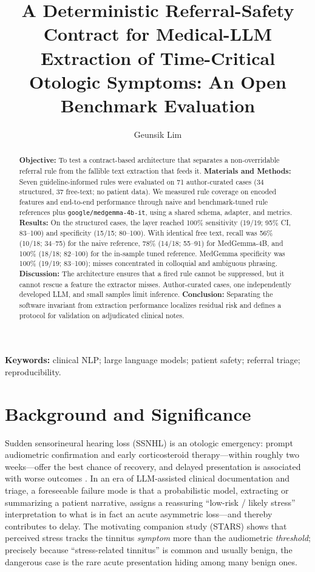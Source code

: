 \documentclass[11pt]{article}
\title{A Deterministic Referral-Safety Contract for Medical-LLM Extraction of Time-Critical Otologic Symptoms: An Open Benchmark Evaluation}
\author[1]{Geunsik Lim}
\affil[1]{Sungkyunkwan University, Republic of Korea; \texttt{leemgs@g.skku.edu}; ORCID \href{https://orcid.org/0000-0003-1845-7132}{0000-0003-1845-7132}}
\date{}
\begin{document}
\maketitle
\thispagestyle{fancy}

\begin{abstract}
\noindent\textbf{Objective:} To test a contract-based architecture that separates a non-overridable referral rule from the fallible text extraction that feeds it. \textbf{Materials and Methods:} Seven guideline-informed rules were evaluated on 71 author-curated cases (34 structured, 37 free-text; no patient data). We measured rule coverage on encoded features and end-to-end performance through naive and benchmark-tuned rule references plus \texttt{google/medgemma-4b-it}, using a shared schema, adapter, and metrics. \textbf{Results:} On the structured cases, the layer reached 100\% sensitivity (19/19; 95\% CI, 83--100) and specificity (15/15; 80--100). With identical free text, recall was 56\% (10/18; 34--75) for the naive reference, 78\% (14/18; 55--91) for MedGemma-4B, and 100\% (18/18; 82--100) for the in-sample tuned reference. MedGemma specificity was 100\% (19/19; 83--100); misses concentrated in colloquial and ambiguous phrasing. \textbf{Discussion:} The architecture ensures that a fired rule cannot be suppressed, but it cannot rescue a feature the extractor misses. Author-curated cases, one independently developed LLM, and small samples limit inference. \textbf{Conclusion:} Separating the software invariant from extraction performance localizes residual risk and defines a protocol for validation on adjudicated clinical notes.
\end{abstract}

\noindent\textbf{Keywords:} clinical NLP; large language models; patient safety; referral triage; reproducibility.

\section{Background and Significance}
Sudden sensorineural hearing loss (SSNHL) is an otologic emergency: prompt audiometric confirmation and early corticosteroid therapy---within roughly two weeks---offer the best chance of recovery, and delayed presentation is associated with worse outcomes \cite{chandrasekhar2019ssnhl}. In an era of LLM-assisted clinical documentation and triage, a foreseeable failure mode is that a probabilistic model, extracting or summarizing a patient narrative, assigns a reassuring ``low-risk / likely stress'' interpretation to what is in fact an acute asymmetric loss---and thereby contributes to delay. The motivating companion study (STARS) shows that perceived stress tracks the tinnitus \emph{symptom} more than the audiometric \emph{threshold}; precisely because ``stress-related tinnitus'' is common and usually benign, the dangerous case is the rare acute presentation hiding among many benign ones.
\end{document}
